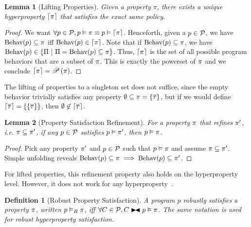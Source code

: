 \documentclass[a4paper,names,dvipsnames]{article}
\newtheorem{definition}{Definition}
\newtheorem{lemma}{Lemma}
\begin{document}
\begin{lemma}[Lifting Properties]
  Given a property $\pi$, there exists a unique hyperproperty $\left\lceil{\pi}\right\rceil$ that satisfies the exact same policy.
\end{lemma}
\begin{proof}
  We want $\forall p \in\mathcal{P}, {p}\vDash{\pi}\equiv{p}\vDash{\left\lceil{\pi}\right\rceil}$.
  Henceforth, given a $p\in\mathcal{P}$, we have $\text{Behav}({p})\subseteq\pi$ iff $\text{Behav}({p})\in\left\lceil{\pi}\right\rceil$.
  Note that if $\text{Behav}({p})\subseteq\pi$, we have $\behav{p}\in\left\{\Pi\ |\ \Pi=\behav{p}\subseteq\prop\right\}$.
  Thus, $\left\lceil{\pi}\right\rceil$ is the set of all possible program behaviors that are a subset of $\pi$.
  This is exactly the powerset of $\pi$ and we conclude $\left\lceil{\pi}\right\rceil=\mathscr{P}\left({\pi}\right)$.
\end{proof}
\noindent
The lifting of properties to a singleton set does not suffice, since the empty behavior trivially satisfies any property $\emptyset\subseteq\pi=\{\overline{\tau}\}$, but if we would define $\left\lceil{\overline{\tau}}\right\rceil=\{\{\overline{\tau}\}\}$, then $\emptyset\not\in\left\lceil{\overline{\tau}}\right\rceil$.

\begin{lemma}[Property Satisfaction Refinement]
  For a property $\pi$ that refines $\pi'$, i.e. $\pi\subseteq\pi'$, if any $p\in\mathcal{P}$ satisfies ${p}\vDash{\pi'}$, then ${p}\vDash{\pi}$.
\end{lemma}
\begin{proof}
  Pick any property $\pi'$ and $p\in\mathcal{P}$ such that ${p}\vDash{\pi}$ and assume $\pi\subseteq\pi'$.
  Simple unfolding reveals $\text{Behav}({p})\subseteq\pi\implies\text{Behav}({p})\subseteq\pi'$.
\end{proof}
\noindent
For lifted properties, this refinement property also holds on the hyperproperty level.
However, it does not work for any hyperproperty~\cite{clarkson08}.

\begin{definition}[Robust Property Satisfaction]
  A program $p$ robustly satisfies a property $\pi$, written ${p}\vDash_{\scriptstyle R}{\pi}$, iff $\forall C\in\partials,\sat{C\linker p}{\prop}$. The same notation is used for robust hyperproperty satisfaction.
\end{definition}
\end{document}
